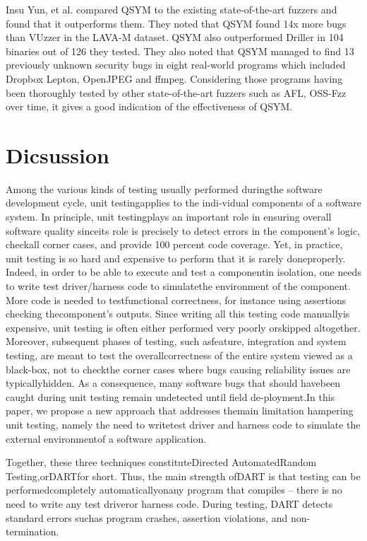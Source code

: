 \documentclass[	runningheads,
				a4paper]{llncs}
\begin{document}
Insu Yun, et al. compared QSYM \cite{yun2018qsym} to the existing state-of-the-art fuzzers and found that it outperforms them. They noted that QSYM found 14x more bugs than VUzzer in the LAVA-M dataset. QSYM also outperformed Driller in 104 binaries out of 126 they tested. They also noted that QSYM managed to find 13 previously unknown security bugs in eight real-world programs which included Dropbox Lepton, OpenJPEG and ffmpeg. Considering those programs having been thoroughly tested by other state-of-the-art fuzzers such as AFL, OSS-Fzz over time, it gives a good indication of the effectiveness of QSYM.



\section{Dicsussion}
Among the various kinds of testing usually performed duringthe  software  development  cycle, unit  testingapplies  to  the  indi-vidual components of a software system. In principle, unit testingplays an important role in ensuring overall software quality sinceits role is precisely to detect errors in the component’s logic, checkall corner cases, and provide 100 percent code coverage. Yet, in practice, unit testing is so hard and expensive to perform that it is rarely doneproperly. Indeed, in order to be able to execute and test a componentin isolation, one needs to write test driver/harness code to simulatethe  environment  of  the  component.  More  code  is  needed  to  testfunctional correctness, for instance using assertions checking thecomponent’s outputs. Since writing all this testing code manuallyis expensive, unit testing is often either performed very poorly orskipped altogether. Moreover, subsequent phases of testing, such asfeature, integration and system testing, are meant to test the overallcorrectness of the entire system viewed as a black-box, not to checkthe corner cases where bugs causing reliability issues are typicallyhidden. As a consequence,  many software bugs that should havebeen caught  during unit testing remain undetected  until field de-ployment.In  this  paper,  we  propose  a  new  approach  that  addresses  themain limitation hampering unit testing, namely the need to writetest driver and harness code to simulate the external environmentof a software application.

Together,  these  three  techniques  constituteDirected  AutomatedRandom  Testing,orDARTfor  short.  Thus,  the  main  strength  ofDART is that testing can be performedcompletely automaticallyonany program that compiles – there is no need to write any test driveror harness code. During testing, DART detects standard errors suchas program crashes, assertion violations, and non-termination.
\end{document}
